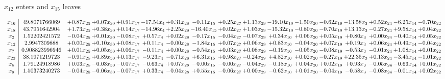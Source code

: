 \documentclass[9pt]{article}
\begin{document}
 $ x_{12} $ enters and $ x_{15} $ leaves 

 \[\begin{array}{c| c c@{\hskip 2pt} c@{\hskip 2pt} c@{\hskip 2pt} c@{\hskip 2pt} c@{\hskip 2pt} c@{\hskip 2pt} c@{\hskip 2pt} c@{\hskip 2pt} c@{\hskip 2pt} c@{\hskip 2pt} c@{\hskip 2pt} c@{\hskip 2pt} c@{\hskip 2pt} c@{\hskip 2pt} c@{\hskip 2pt} }
 x_{16}   &  49.8071766069 & +  0.87 x_{25} & +  0.07 x_{30} & +  0.91 x_{17} & -17.54 x_{4} & +  0.31 x_{28} & -0.11 x_{15} & +  0.25 x_{27} & +  1.13 x_{29} & -19.10 x_{10} & -1.50 x_{20} & -0.62 x_{19} & -13.58 x_{3} & +  0.52 x_{24} & -6.25 x_{14} & -0.70 x_{22}\\
 x_{18}   &  43.7951642904 & +  1.73 x_{25} & +  0.38 x_{30} & +  0.14 x_{17} & -14.96 x_{4} & +  2.25 x_{28} & -16.40 x_{15} & +  0.02 x_{27} & +  1.03 x_{29} & -15.32 x_{10} & -0.80 x_{20} & -0.70 x_{19} & + 13.13 x_{3} & -0.27 x_{24} & +  9.58 x_{14} & +  0.04 x_{22}\\
 x_{2}   &  1.52202421572 & -0.04 x_{25} & +  0.01 x_{30} & -0.08 x_{17} & +  0.57 x_{4} & +  0.02 x_{28} & -0.17 x_{15} & -0.04 x_{27} & -0.07 x_{29} & +  0.34 x_{10} & +  0.06 x_{20} & +  0.05 x_{19} & +  0.80 x_{3} & +  0.00 x_{24} & -0.40 x_{14} & +  0.05 x_{22}\\
 x_{12}   &  2.9947309888 & +  0.00 x_{25} & +  0.10 x_{30} & +  0.08 x_{17} & +  0.11 x_{4} & -0.00 x_{28} & -1.84 x_{15} & +  0.07 x_{27} & +  0.06 x_{29} & +  0.83 x_{10} & -0.04 x_{20} & +  0.07 x_{19} & +  0.19 x_{3} & +  0.06 x_{24} & +  0.49 x_{14} & -0.04 x_{22}\\
 x_{7}   &  0.908823996946 & +  0.01 x_{25} & +  0.05 x_{30} & +  0.06 x_{17} & -0.11 x_{4} & +  0.00 x_{28} & -0.54 x_{15} & +  0.03 x_{27} & +  0.08 x_{29} & -0.19 x_{10} & -0.05 x_{20} & -0.08 x_{19} & -0.53 x_{3} & -0.01 x_{24} & +  1.08 x_{14} & +  0.01 x_{22}\\
 x_{23}   &  38.1971219723 & -0.91 x_{25} & +  0.89 x_{30} & +  0.13 x_{17} & -9.23 x_{4} & -0.71 x_{28} & +  6.31 x_{15} & +  0.98 x_{27} & -0.24 x_{29} & +  4.82 x_{10} & +  0.02 x_{20} & -0.27 x_{19} & + 22.35 x_{3} & +  0.13 x_{24} & -3.45 x_{14} & -1.01 x_{22}\\
 x_{6}   &  1.79124918986 & +  0.03 x_{25} & -0.03 x_{30} & -0.07 x_{17} & -0.63 x_{4} & +  0.07 x_{28} & -0.00 x_{15} & -0.00 x_{27} & -0.04 x_{29} & -0.18 x_{10} & +  0.04 x_{20} & +  0.02 x_{19} & +  0.93 x_{3} & -0.05 x_{24} & -0.63 x_{14} & +  0.01 x_{22}\\
 x_{9}   &  1.50373240273 & -0.04 x_{25} & -0.06 x_{30} & -0.07 x_{17} & +  0.33 x_{4} & -0.04 x_{28} & +  0.55 x_{15} & -0.06 x_{27} & +  0.00 x_{29} & -0.62 x_{10} & +  0.01 x_{20} & -0.04 x_{19} & -0.58 x_{3} & -0.08 x_{24} & -0.01 x_{14} & +  0.02 x_{22}\\

\end{array}\]
\end{document}
